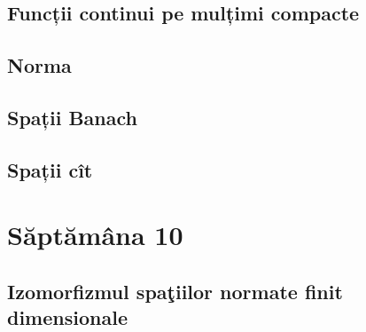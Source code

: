 \documentclass[a4paper,12pt]{article}
\theoremstyle{change}
\begin{document}
\subsection{Funcții continui pe mulțimi compacte}


\subsection{Norma}


\subsection{Spații Banach}

\subsection{Spații cît}

\section{Săptămâna 10}


\subsection{Izomorfizmul spaţiilor normate finit dimensionale}
\end{document}
